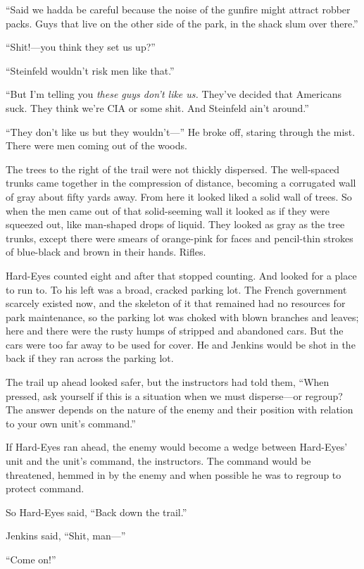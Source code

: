 ``Said we hadda be careful because the noise of the gunfire might attract robber packs. Guys that live on the other side of the park, in the shack slum over there.''

``Shit!---you think they set us up?''

``Steinfeld wouldn't risk men like that.''

``But I'm telling you \textit{these guys don't like us.} They've decided that Americans suck. They think we're CIA or some shit. And Steinfeld ain't around.''

``They don't like us but they wouldn't---'' He broke off, staring through the mist. There were men coming out of the woods.

The trees to the right of the trail were not thickly dispersed. The well-spaced trunks came together in the compression of distance, becoming a corrugated wall of gray about fifty yards away. From here it looked liked a solid wall of trees. So when the men came out of that solid-seeming wall it looked as if they were squeezed out, like man-shaped drops of liquid. They looked as gray as the tree trunks, except there were smears of orange-pink for faces and pencil-thin strokes of blue-black and brown in their hands. Rifles.

Hard-Eyes counted eight and after that stopped counting. And looked for a place to run to. To his left was a broad, cracked parking lot. The French government scarcely existed now, and the skeleton of it that remained had no resources for park maintenance, so the parking lot was choked with blown branches and leaves; here and there were the rusty humps of stripped and abandoned cars. But the cars were too far away to be used for cover. He and Jenkins would be shot in the back if they ran across the parking lot.

The trail up ahead looked safer, but the instructors had told them, ``When pressed, ask yourself if this is a situation when we must disperse---or regroup? The answer depends on the nature of the enemy and their position with relation to your own unit's command.''

If Hard-Eyes ran ahead, the enemy would become a wedge between Hard-Eyes' unit and the unit's command, the instructors. The command would be threatened, hemmed in by the enemy and when possible he was to regroup to protect command.

So Hard-Eyes said, ``Back down the trail.''

Jenkins said, ``Shit, man---''

``Come on!''

